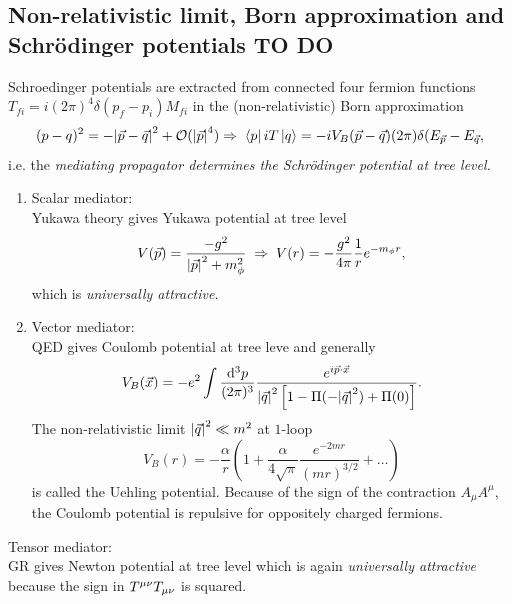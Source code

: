 \subsection{Non-relativistic limit, Born approximation and Schrödinger potentials TO DO}
\begin{mybox}{}
	Schroedinger potentials are extracted from connected four fermion functions$T_{fi} = i(2 \pi)^4 \delta(p_f-p_i) M_{fi}$ in the (non-relativistic) Born approximation
	\begin{equation}
	(p-q)^2 = - \abs{\vec{p}-\vec{q}}^2 + \mathcal{O}(\abs{\vec{p}}^4) \Rightarrow\; \bra{p}iT\ket{q}=-iV_B(\vec{p}-\vec{q}) (2 \pi) \delta(E_{\vec{p}} -E_{\vec{q}},
	\end{equation}
	i.e. the \emph{mediating propagator determines the Schrödinger potential at tree level.}\\
	\begin{enumerate}
		\item 
	Scalar mediator: \\
	Yukawa theory gives Yukawa potential at tree level
	\begin{equation}
		V(\vec{p})=\frac{-g^2}{\abs{\vec{p}}^2+m^2_\phi}\;\Rightarrow\; V(r)=-\frac{g^2}{4\pi } \frac{1}{r} e^{-m_\phi r},
	\end{equation}
	which is \emph{universally attractive}.\\
	\item Vector mediator:\\
	QED gives Coulomb potential at tree leve and generally 
	\begin{equation}
		V_B(\vec{x}) = -e^2 \int \frac{\mathrm{d}^3 p}{(2 \pi)^3} \frac{e^{i \vec{p}\cdot \vec{x}}}{\abs{\vec{q}}^2 \left[1 -\Pi(-\abs{\vec{q}}^2) + \Pi(0)\right]}.
	\end{equation}
	The non-relativistic limit $\abs{\vec{q}}^2 \ll m^2$ at $1$-loop
	\begin{equation}
		V_B(r)= -\frac{\alpha}{r} \left(1+\frac{\alpha}{4\sqrt{\pi} } \frac{e^{-2mr}}{(mr)^{3/2}} + \dots\right)
	\end{equation}
	is called the Uehling potential. Because of the sign of the contraction $A_\mu A^\mu$, the Coulomb potential is repulsive for oppositely charged fermions.
\end{enumerate}

\end{mybox}
Tensor mediator:\\
GR gives Newton potential at tree level which is again \emph{universally attractive} because the sign in $T^{\mu \nu}T_{\mu \nu}$ is squared.

